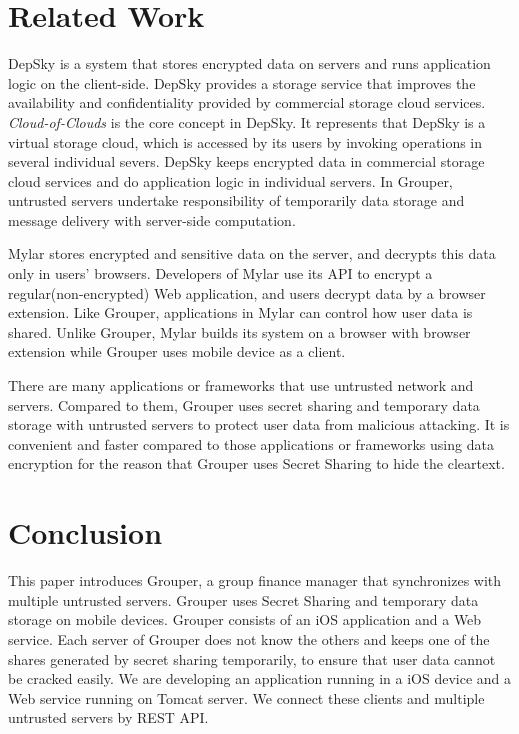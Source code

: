 \documentclass[twocolumn,10pt]{article}
\begin{document}
\section{Related Work}

DepSky\cite{bessani2013depsky} is a system that stores encrypted data on servers and runs application logic on the client-side\cite{wang2016sieve}. DepSky provides a storage service that improves the availability and confidentiality provided by commercial storage cloud services. \emph{Cloud-of-Clouds} is the core concept in DepSky. It represents that DepSky is a virtual storage cloud, which is accessed by its users by invoking operations in several individual severs. DepSky keeps encrypted data in commercial storage cloud services and do application logic in individual servers. In Grouper,  untrusted servers undertake responsibility of temporarily data storage and message delivery with server-side computation.

Mylar\cite{popa2014building} stores encrypted and sensitive data on the server, and decrypts this data only in users’ browsers. Developers of Mylar use its API to encrypt a regular(non-encrypted) Web application, and users decrypt data by a browser extension. Like Grouper, applications in Mylar can control how user data is shared\cite{wang2016sieve}. Unlike Grouper, Mylar builds its system on a browser with browser extension while Grouper uses mobile device as a client.

There are many applications or frameworks that use untrusted network and servers. Compared to them, Grouper uses secret sharing and temporary data storage with untrusted servers to protect user data from malicious attacking. It is convenient and faster compared to those applications or frameworks using data encryption for the reason that Grouper uses Secret Sharing to hide the cleartext.

\section{Conclusion}

This paper introduces Grouper, a group finance manager that synchronizes with multiple untrusted servers. Grouper uses Secret Sharing and temporary data storage on mobile devices. Grouper consists of an iOS application and a Web service.  Each server of Grouper does not know the others and keeps one of the shares generated by secret sharing temporarily, to ensure that user data cannot be cracked easily. We are developing an application running in a iOS device and a Web service running on Tomcat server. We connect these clients and multiple untrusted servers by REST API.



\end{document}
